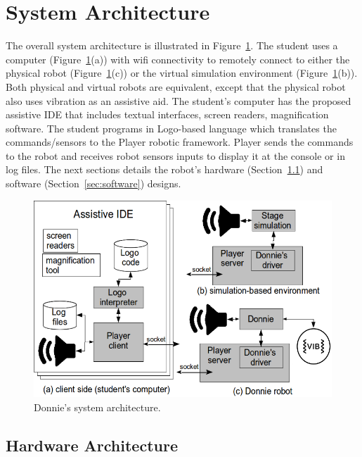\section{System Architecture}
\label{sec:system}


The overall system architecture is illustrated in Figure~\ref{fig:donnie-sys}. The student uses a computer (Figure~\ref{fig:donnie-sys}(a)) with wifi connectivity to remotely connect to either the physical robot (Figure~\ref{fig:donnie-sys}(c)) or the virtual simulation environment (Figure~\ref{fig:donnie-sys}(b)). Both physical and virtual robots are equivalent, except that the physical robot also uses vibration as an assistive aid. The student's computer has the proposed assistive IDE that includes textual interfaces, screen readers, magnification software. The student programs in Logo-based language which translates the commands/sensors to the Player robotic framework. Player sends the commands to the robot and receives robot sensors inputs to display it at the console or in log files. The next sections details the robot's hardware (Section~\ref{sec:hardware}) and software (Section~\ref{sec:software}) designs.

\begin{figure}[h!]
  \centering
    \includegraphics[width=0.95\linewidth]{figs/assistive-env.png}
  \caption{Donnie's system architecture.}
  \label{fig:donnie-sys}
\end{figure}



\subsection{Hardware Architecture}
\label{sec:hardware}

